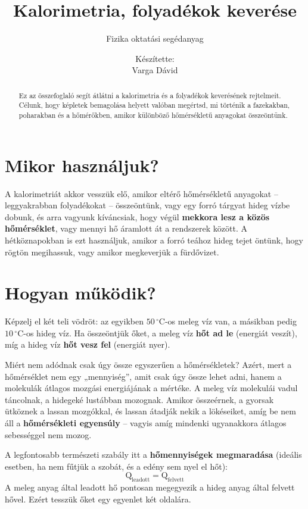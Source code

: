 \documentclass[11pt,a4paper]{article}
\title{Kalorimetria, folyadékok keverése}
\author{Fizika oktatási segédanyag}
\date{}
\begin{document}
\title{}
\author{Készítette:\\Varga Dávid}
\date{}
\maketitle

\begin{abstract}
Ez az összefoglaló segít átlátni a kalorimetria és a folyadékok keverésének rejtelmeit. Célunk, hogy képletek bemagolása helyett valóban megértsd, mi történik a fazekakban, poharakban és a hőmérőkben, amikor különböző hőmérsékletű anyagokat összeöntünk.
\end{abstract}

\section{Mikor használjuk?}
A kalorimetriát akkor vesszük elő, amikor eltérő hőmérsékletű anyagokat – leggyakrabban folyadékokat – összeöntünk, vagy egy forró tárgyat hideg vízbe dobunk, és arra vagyunk kíváncsiak, hogy végül \textbf{mekkora lesz a közös hőmérséklet}, vagy mennyi hő áramlott át a rendszerek között. A hétköznapokban is ezt használjuk, amikor a forró teához hideg tejet öntünk, hogy rögtön megihassuk, vagy amikor megkeverjük a fürdővizet.

\section{Hogyan működik?}
Képzelj el két teli vödröt: az egyikben $50\,^\circ\text{C}$-os meleg víz van, a másikban pedig $10\,^\circ\text{C}$-os hideg víz. Ha összeöntjük őket, a meleg víz \textbf{hőt ad le} (energiát veszít), míg a hideg víz \textbf{hőt vesz fel} (energiát nyer). 

Miért nem adódnak csak úgy össze egyszerűen a hőmérsékletek? Azért, mert a hőmérséklet nem egy „mennyiség”, amit csak úgy össze lehet adni, hanem a molekulák átlagos mozgási energiájának a mértéke. A meleg víz molekulái vadul táncolnak, a hidegeké lustábban mozognak. Amikor összeérnek, a gyorsak ütköznek a lassan mozgókkal, és lassan átadják nekik a lökéseiket, amíg be nem áll a \textbf{hőmérsékleti egyensúly} – vagyis amíg mindenki ugyanakkora átlagos sebességgel nem mozog.

A legfontosabb természeti szabály itt a \textbf{hőmennyiségek megmaradása} (ideális esetben, ha nem fűtjük a szobát, és a edény sem nyel el hőt):
$$\text{Q}_{\text{leadott}} = \text{Q}_{\text{felvett}}$$
A meleg anyag által leadott hő pontosan megegyezik a hideg anyag által felvett hővel. Ezért tesszük őket egy egyenlet két oldalára.
\end{document}
